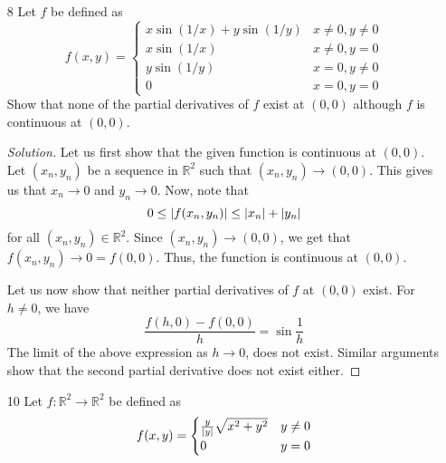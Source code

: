 \documentclass[12pt]{article}
\theoremstyle{definition}
\newenvironment{soln}{\begin{proof}[Solution]}{\end{proof}}
\begin{document}
\begin{enumerate}[leftmargin=*]
\begin{soln}
        For $h \neq 0$, we have
        \[
            \frac{f(h,0) - f(0,0)}{h}
            = \left( \frac{\sin^2{h}}{h\abs{h}} \right)
        \]
        
        It is easy to show that the above limit (as $h$ goes to $0$) does not exist (Take strictly positive and strictly negative sequences converging to zero). Hence, we see that $\dfrac{\partial f}{\partial x_1}(0,0)$ does not exist. Similar arguments show that the second partial does not exist either.
    \end{soln}
    
    \newpage
    
    \item[8] Let $f$ be defined as 
    \[
        f(x,y) = \begin{cases}
            x \sin{\left( 1/x \right)} + y \sin{\left( 1/y \right)} & x \neq 0, y \neq 0 \\
            x \sin{\left( 1/x \right)} & x \neq 0, y = 0 \\
            y \sin{\left( 1/y \right)} & x=0, y \neq 0 \\
            0 & x=0, y=0
        \end{cases}
    \]
    Show that none of the partial derivatives of $f$ exist at $(0,0)$ although $f$ is continuous at $(0,0)$.
    
    \begin{soln}
        Let us first show that the given function is continuous at $(0,0)$. Let $(x_n,y_n)$ be a sequence in $\mathbb{R}^2$ such that $(x_n, y_n) \to (0,0)$. This gives us that $x_n \to 0$ and $y_n \to 0$. Now, note that
        \[
            0 \leq \abs{f(x_n, y_n)} \leq \abs{x_n} + \abs{y_n}
        \]
        for all $(x_n, y_n) \in \mathbb{R}^2$. Since $(x_n, y_n) \to (0,0)$, we get that $f(x_n, y_n) \to 0 = f(0,0)$. Thus, the function is continuous at $(0,0)$.
        
        \medskip
        
        Let us now show that neither partial derivatives of $f$ at $(0,0)$ exist. For $h \neq 0$, we have
        \[
            \frac{f(h,0) - f(0,0)}{h} = \sin{\frac{1}{h}}
        \]
        The limit of the above expression as $h \to 0$, does not exist. Similar arguments show that the second partial derivative does not exist either.
    \end{soln}
    
    \newpage
    
    \item[10] Let $f \colon \mathbb{R}^2 \to \mathbb{R}^2$ be defined as 
    \[
        f(x,y) = \begin{cases}
            \frac{y}{\abs{y}} \sqrt{x^2 + y^2} & y \neq 0 \\
            0 & y = 0
        \end{cases}
    \]
    

\end{enumerate}
\end{document}
